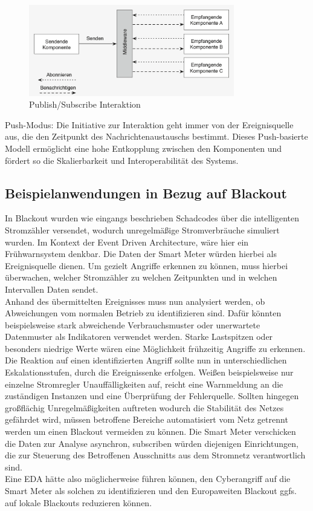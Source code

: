 \documentclass[a4paper,12pt]{article}
\begin{document}
\begin{figure}[h]
    \centering
    \includegraphics[width=0.8\textwidth]{images/Publish_Subscirbe.png}
    \caption{Publish/Subscribe Interaktion \cite[S. 54]{Bruns2010}}
    \label{fig:PubSub}
\end{figure}
Push-Modus: Die Initiative zur Interaktion geht immer von der Ereignisquelle aus, die den Zeitpunkt des Nachrichtenaustauschs bestimmt. Dieses Push-basierte Modell ermöglicht eine hohe Entkopplung zwischen den Komponenten und fördert so die Skalierbarkeit und Interoperabilität des Systems. \cite [S. 53f]{Bruns2010}
\subsection{Beispielanwendungen in Bezug auf Blackout}
In Blackout wurden wie eingangs beschrieben Schadcodes über die intelligenten Stromzähler versendet, wodurch unregelmäßige Stromverbräuche simuliert wurden. Im Kontext der Event Driven Architecture, wäre hier ein Frühwarnsystem denkbar. Die Daten der Smart Meter würden hierbei als Ereignisquelle dienen. Um gezielt Angriffe erkennen zu können, muss hierbei überwachen, welcher Stromzähler zu welchen Zeitpunkten und in welchen Intervallen Daten sendet.\\
Anhand des übermittelten Ereignisses muss nun analysiert werden, ob Abweichungen vom normalen Betrieb zu identifizieren sind. Dafür könnten beispielsweise stark abweichende Verbrauchsmuster oder unerwartete Datenmuster als Indikatoren verwendet werden. Starke Lastspitzen oder besonders niedrige Werte wären eine Möglichkeit frühzeitig Angriffe zu erkennen.\\
Die Reaktion auf einen identifizierten Angriff sollte nun in unterschiedlichen Eskalationsstufen, durch die Ereignissenke erfolgen. Weißen beispielsweise nur einzelne Stromregler Unauffälligkeiten auf, reicht eine Warnmeldung an die zuständigen Instanzen und eine Überprüfung der Fehlerquelle. Sollten hingegen großflächig Unregelmäßigkeiten auftreten wodurch die Stabilität des Netzes gefährdet wird, müssen betroffene Bereiche automatisiert vom Netz getrennt werden um einen Blackout vermeiden zu können. Die Smart Meter verschicken die Daten zur Analyse asynchron, subscriben würden diejenigen Einrichtungen, die zur Steuerung des Betroffenen Ausschnitts aus dem Stromnetz verantwortlich sind.\\
Eine EDA hätte also möglicherweise führen können, den Cyberangriff auf die Smart Meter als solchen zu identifizieren und den Europaweiten Blackout ggfs. auf lokale Blackouts reduzieren können.
\end{document}
